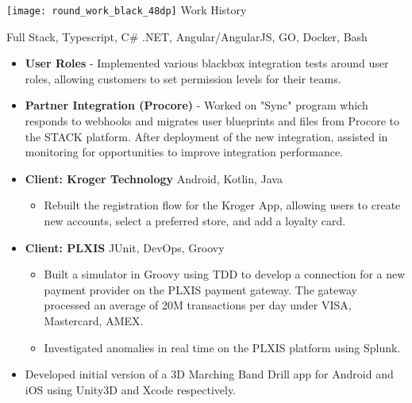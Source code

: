 {\noindent \texttt{[image: round\_work\_black\_48dp]} \hspace{0.25pc}  \large Work History}\hspace{1pc}{\noindent\rule{36.75pc}{0.4pt}}

\vspace{1pc}


{\color{gray} Full Stack, Typescript, C\# .NET, Angular/AngularJS, GO, Docker, Bash}

\begin{itemize}
	\item \textbf{User Roles} - Implemented various blackbox integration tests around user roles, allowing customers to set permission levels for their teams.
	\item \textbf{Partner Integration (Procore)} - Worked on "Sync" program which responds to webhooks and migrates user blueprints and files from Procore to the STACK platform.
	After deployment of the new integration, assisted in monitoring for opportunities to improve integration performance.
\end{itemize}


\begin{itemize}
	\item \textbf{Client: Kroger Technology} \hspace{0.5pc} {\color{gray}Android, Kotlin, Java}
	\begin{itemize}
		\item Rebuilt the registration flow for the Kroger App, allowing users to create new accounts, select a preferred store, and add a loyalty card. 
	\end{itemize}
	\item \textbf{Client: PLXIS} \hspace{0.5pc} {\color{gray} JUnit, DevOps, Groovy}
	\begin{itemize}
		\item Built a simulator in Groovy using TDD to develop a connection for a new payment provider on the PLXIS payment gateway. The gateway processed an average of 20M transactions per day under VISA, Mastercard, AMEX.
		
		\item Investigated anomalies in real time on the PLXIS platform using Splunk.
	\end{itemize}
	
\end{itemize}

\begin{itemize}
	\item Developed initial version of a 3D Marching Band Drill app for Android and iOS using Unity3D and Xcode respectively.
\end{itemize}